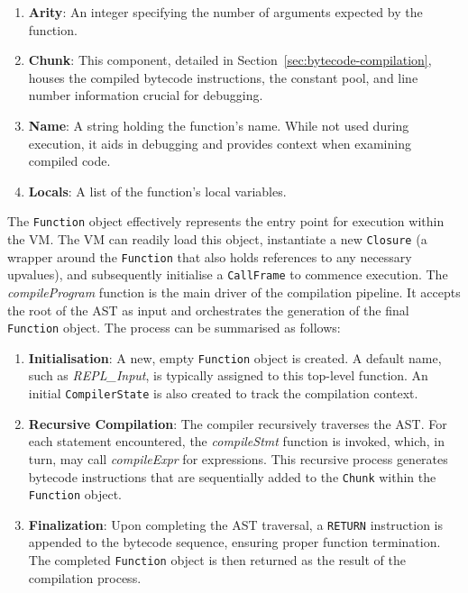 \begin{enumerate}
    \item \textbf{Arity}: An integer specifying the number of arguments expected by the function.
    \item \textbf{Chunk}: This component, detailed in Section~\ref{sec:bytecode-compilation}, houses the compiled bytecode instructions, the constant pool, and line number information crucial for debugging.
    \item \textbf{Name}: A string holding the function's name.
    While not used during execution, it aids in debugging and provides context when examining compiled code.
    \item \textbf{Locals}: A list of the function's local variables.
\end{enumerate}
The \texttt{Function} object effectively represents the entry point for execution within the VM. The VM can readily 
load this object, instantiate a new \texttt{Closure} (a wrapper around the \texttt{Function} that also holds references to any necessary upvalues), and subsequently initialise a \texttt{CallFrame} to commence execution.
The \textit{compileProgram} function is the main driver of the compilation pipeline.
It accepts the root of the AST as input and orchestrates the generation of the final \texttt{Function} object.
The process can be summarised as follows:

\begin{enumerate}
    \item \textbf{Initialisation}: A new, empty \texttt{Function} object is created.
    A default name, such as \textit{REPL\_Input}, is typically assigned to this top-level function.
    An initial \texttt{CompilerState} is also created to track the compilation context.
    \item \textbf{Recursive Compilation}: The compiler recursively traverses the AST. For each statement 
    encountered, the \textit{compileStmt} function is invoked, which, in turn, may call \textit{compileExpr} for expressions. 
    This recursive process generates bytecode instructions that are sequentially added to the \texttt{Chunk} within the \texttt{Function} object.
    \item \textbf{Finalization}: Upon completing the AST traversal, a \texttt{RETURN} instruction is appended to the bytecode sequence, ensuring proper function termination.
    The completed \texttt{Function} object is then returned as the result of the compilation process.
\end{enumerate}

